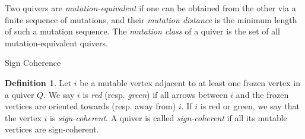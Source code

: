 \documentclass[12pt]{amsart}
\makeatletter
\theoremstyle{definition}
\newtheorem{definition}[thm]{Definition}
\theoremstyle{remark}
\numberwithin{equation}{section}
\def\subsection{\@startsection{subsection}{3}%
  \z@{.5\linespacing\@plus.7\linespacing}{.1\linespacing}%
  {\bfseries}}
\makeatother
\begin{document}
Two quivers are \emph{mutation-equivalent} if one can be obtained from the other via a finite sequence of mutations, and their \emph{mutation distance} is the minimum length of such a mutation sequence. The \emph{mutation class} of a quiver is the set of all mutation-equivalent quivers.  

\subsection{Sign Coherence}

\begin{definition}\label{defn: red green}
Let $i$ be a mutable vertex adjacent to at least one frozen vertex in a quiver $Q$. 
We say $i$ is \emph{red} (resp. \emph{green}) if all arrows between $i$ and the frozen vertices are oriented towards (resp. away from) $i$.  
If $i$ is red or green, we say that the vertex $i$ is \emph{sign-coherent}.  
A quiver is called \emph{sign-coherent} if all its mutable vertices are sign-coherent. 
\end{definition}
\end{document}
